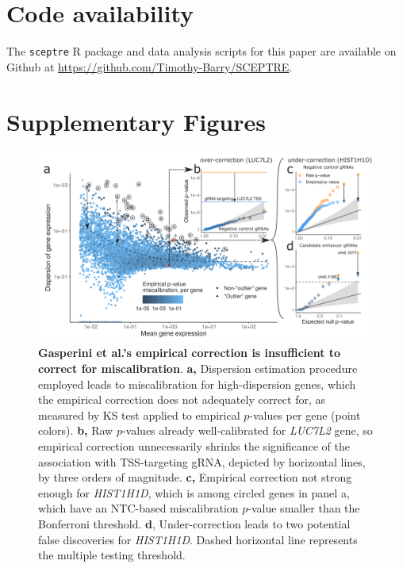 \documentclass{nature}
\begin{document}
\section*{Code availability}

The \texttt{sceptre} R package and data analysis scripts for this paper are available on Github at \url{https://github.com/Timothy-Barry/SCEPTRE}.

\clearpage 
\appendix

\section*{Supplementary Figures}
\thispagestyle{empty}
\setcounter{figure}{0}    
\renewcommand{\thefigure}{S\arabic{figure}}

\begin{figure}[h!]
	\centering
	\includegraphics[width = \textwidth]{figures/FigureS1/FigureS1.png}
	\caption{\textbf{Gasperini et al.'s empirical correction is insufficient to correct for miscalibration}. \textbf{a,} Dispersion estimation procedure employed leads to miscalibration for high-dispersion genes, which the empirical correction does not adequately correct for, as measured by KS test applied to empirical $p$-values per gene (point colors). \textbf{b,} Raw $p$-values already well-calibrated for \textit{LUC7L2} gene, so empirical correction unnecessarily shrinks the significance of the association with TSS-targeting gRNA, depicted by horizontal lines, by three orders of magnitude. \textbf{c,} Empirical correction not strong enough for \textit{HIST1H1D}, which is among circled genes in panel a, which have an NTC-based miscalibration $p$-value smaller than the Bonferroni threshold. \textbf{d}, Under-correction leads to two potential false discoveries for \textit{HIST1H1D}. Dashed horizontal line represents the multiple testing threshold.}
	\label{fig:gasp_correction}
\end{figure}
\end{document}
